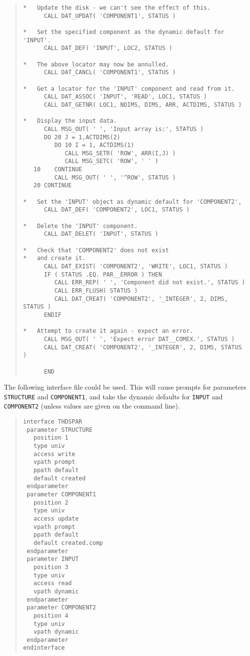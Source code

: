 \documentclass[twoside,11pt]{article}
\renewcommand{\_}{\texttt{\symbol{95}}}
\begin{document}
\begin{quote}
\begin{verbatim}
*   Update the disk - we can't see the effect of this.
      CALL DAT_UPDAT( 'COMPONENT1', STATUS )

*   Set the specified component as the dynamic default for 'INPUT'.
      CALL DAT_DEF( 'INPUT', LOC2, STATUS )

*   The above locator may now be annulled.
      CALL DAT_CANCL( 'COMPONENT1', STATUS )

*   Get a locator for the 'INPUT' component and read from it.
      CALL DAT_ASSOC( 'INPUT', 'READ', LOC1, STATUS )
      CALL DAT_GETNR( LOC1, NDIMS, DIMS, ARR, ACTDIMS, STATUS )

*   Display the input data.
      CALL MSG_OUT( ' ', 'Input array is:', STATUS )
      DO 20 J = 1,ACTDIMS(2)
         DO 10 I = 1, ACTDIMS(1)
            CALL MSG_SETR( 'ROW', ARR(I,J) )
            CALL MSG_SETC( 'ROW', ' ' )
   10    CONTINUE
         CALL MSG_OUT( ' ', '^ROW', STATUS )
   20 CONTINUE

*   Set the 'INPUT' object as dynamic default for 'COMPONENT2',
      CALL DAT_DEF( 'COMPONENT2', LOC1, STATUS )

*   Delete the 'INPUT' component.
      CALL DAT_DELET( 'INPUT', STATUS )

*   Check that 'COMPONENT2' does not exist
*   and create it.
      CALL DAT_EXIST( 'COMPONENT2', 'WRITE', LOC1, STATUS )
      IF ( STATUS .EQ. PAR__ERROR ) THEN
         CALL ERR_REP( ' ', 'Component did not exist.', STATUS )
         CALL ERR_FLUSH( STATUS )
         CALL DAT_CREAT( 'COMPONENT2', '_INTEGER', 2, DIMS, STATUS )
      ENDIF

*   Attempt to create it again - expect an error.
      CALL MSG_OUT( ' ', 'Expect error DAT__COMEX.', STATUS )
      CALL DAT_CREAT( 'COMPONENT2', '_INTEGER', 2, DIMS, STATUS )

      END
\end{verbatim} \end{quote}

The following interface file could be used. This will cause prompts for
parameters \texttt{STRUCTURE} and \texttt{COMPONENT1}, and take the dynamic
defaults for \texttt{INPUT} and \texttt{COMPONENT2} (unless values are given
on the command line).
\begin{quote} \begin{verbatim}
interface THDSPAR
 parameter STRUCTURE
   position 1
   type univ
   access write
   vpath prompt
   ppath default
   default created
 endparameter
 parameter COMPONENT1
   position 2
   type univ
   access update
   vpath prompt
   ppath default
   default created.comp
 endparameter
 parameter INPUT
   position 3
   type univ
   access read
   vpath dynamic
 endparameter
 parameter COMPONENT2
   position 4
   type univ
   vpath dynamic
 endparameter
endinterface

\end{verbatim} \end{quote}
\end{document}
